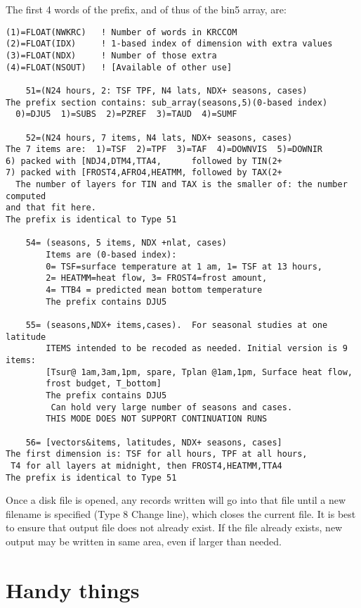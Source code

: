 \documentclass[draft]{article}  %
\begin{document}
The first 4 words of the prefix, and of thus of the bin5 array, are:
\vspace{-3.mm} 
\begin{verbatim}
(1)=FLOAT(NWKRC)   ! Number of words in KRCCOM
(2)=FLOAT(IDX)     ! 1-based index of dimension with extra values
(3)=FLOAT(NDX)     ! Number of those extra
(4)=FLOAT(NSOUT)   ! [Available of other use]

    51=(N24 hours, 2: TSF TPF, N4 lats, NDX+ seasons, cases)
The prefix section contains: sub_array(seasons,5)(0-based index)
  0)=DJU5  1)=SUBS  2)=PZREF  3)=TAUD  4)=SUMF

    52=(N24 hours, 7 items, N4 lats, NDX+ seasons, cases)
The 7 items are:  1)=TSF  2)=TPF  3)=TAF  4)=DOWNVIS  5)=DOWNIR
6) packed with [NDJ4,DTM4,TTA4,      followed by TIN(2+
7) packed with [FROST4,AFRO4,HEATMM, followed by TAX(2+
  The number of layers for TIN and TAX is the smaller of: the number computed 
and that fit here.
The prefix is identical to Type 51

    54= (seasons, 5 items, NDX +nlat, cases)
        Items are (0-based index): 
        0= TSF=surface temperature at 1 am, 1= TSF at 13 hours,
        2= HEATMM=heat flow, 3= FROST4=frost amount, 
        4= TTB4 = predicted mean bottom temperature
        The prefix contains DJU5 

    55= (seasons,NDX+ items,cases).  For seasonal studies at one latitude
        ITEMS intended to be recoded as needed. Initial version is 9 items:
        [Tsur@ 1am,3am,1pm, spare, Tplan @1am,1pm, Surface heat flow,
        frost budget, T_bottom]
        The prefix contains DJU5        
         Can hold very large number of seasons and cases. 
        THIS MODE DOES NOT SUPPORT CONTINUATION RUNS

    56= [vectors&items, latitudes, NDX+ seasons, cases]
The first dimension is: TSF for all hours, TPF at all hours, 
 T4 for all layers at midnight, then FROST4,HEATMM,TTA4
The prefix is identical to Type 51
\end{verbatim}

Once a disk file is opened, any records written will go into that file until a
new filename is specified (Type 8 Change line), which closes the current file.
It is best to ensure that output file does not already exist. If the file
already exists, new output may be written in same area, even if larger than
needed.

 
\section{Handy things} %
\end{document}
